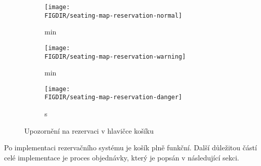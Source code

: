 \begin{figure}[H]
	\centering
	\begin{subfigure}{0.3\textwidth}
		\texttt{[image: \\FIGDIR/seating-map-reservation-normal]}
		\caption{ min}
		\label{fig:seating-map-reservation-normal}
	\end{subfigure}
	\hfill
	\begin{subfigure}{0.3\textwidth}
		\texttt{[image: \\FIGDIR/seating-map-reservation-warning]}
		\caption{ min}
		\label{fig:seating-map-reservation-warning}
	\end{subfigure}
	\hfill
	\begin{subfigure}{0.3\textwidth}
		\texttt{[image: \\FIGDIR/seating-map-reservation-danger]}
		\caption{ s}
		\label{fig:seating-map-reservation-danger}
	\end{subfigure}
	\caption{Upozornění na rezervaci v hlavičce košíku}
	\label{fig:seating-map-reservation}
\end{figure}

Po implementaci rezervačního systému je košík plně funkční.
Další důležitou částí celé implementace je proces objednávky, který je popsán v následující sekci.
